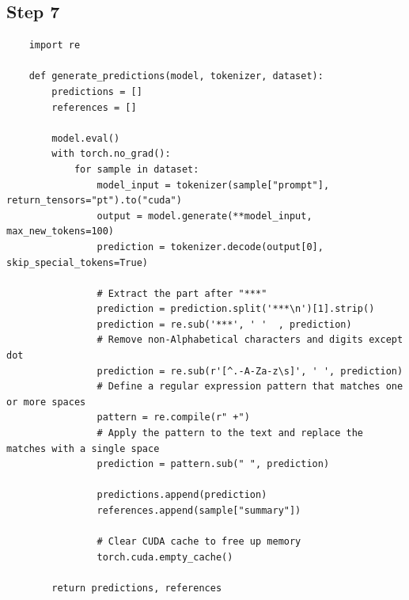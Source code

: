 \documentclass{solutionclass} %
\begin{document}
\subsection*{Step 7}


\begin{lstlisting}
	import re
	
	def generate_predictions(model, tokenizer, dataset):
		predictions = []
		references = []
	
		model.eval()
		with torch.no_grad():
			for sample in dataset:
				model_input = tokenizer(sample["prompt"], return_tensors="pt").to("cuda")
				output = model.generate(**model_input, max_new_tokens=100)
				prediction = tokenizer.decode(output[0], skip_special_tokens=True)
				
				# Extract the part after "***"
				prediction = prediction.split('***\n')[1].strip()
				prediction = re.sub('***', ' '  , prediction)
				# Remove non-Alphabetical characters and digits except dot
				prediction = re.sub(r'[^.-A-Za-z\s]', ' ', prediction)
				# Define a regular expression pattern that matches one or more spaces
				pattern = re.compile(r" +")
				# Apply the pattern to the text and replace the matches with a single space
				prediction = pattern.sub(" ", prediction)
				
				predictions.append(prediction)
				references.append(sample["summary"])
				
				# Clear CUDA cache to free up memory
				torch.cuda.empty_cache()
	
		return predictions, references
	\end{lstlisting}
\end{document}
